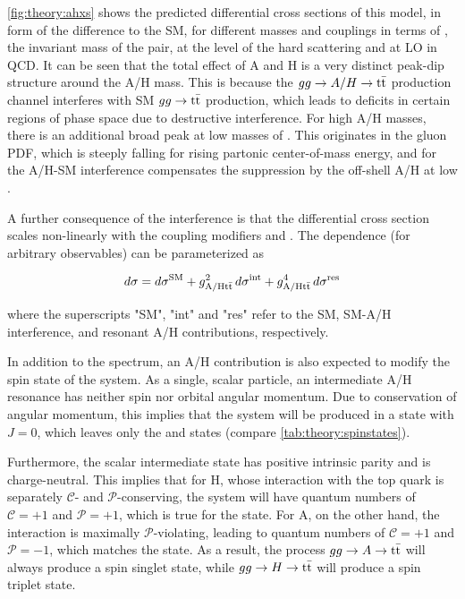 \cref{fig:theory:ahxs} shows the predicted differential cross sections of this model, in form of the difference to the SM, for different masses and couplings in terms of \mtt, the invariant mass of the \ttbar pair, at the level of the hard scattering and at LO in QCD. It can be seen that the total effect of A and H is a very distinct peak-dip structure around the A/H mass. This is because the $gg \rightarrow A/H \rightarrow \mathrm{t \bar{t}}$ production channel interferes with SM $gg \rightarrow \mathrm{t \bar{t}}$ production, which leads to deficits in certain regions of phase space due to destructive interference. For high A/H masses, there is an additional broad peak at low masses of \mtt. This originates in the gluon PDF, which is steeply falling for rising partonic center-of-mass energy, and for the A/H-SM interference compensates the suppression by the off-shell A/H at low \mtt.

A further consequence of the interference is that the differential cross section scales non-linearly with the coupling modifiers \gAtt and \gHtt. The dependence (for arbitrary observables) can be parameterized as 

\begin{equation}
    d \sigma = d \sigma^{\mathrm{SM}} + g_{\mathrm{A/H t \bar{t}}}^2 \, d \sigma^{\mathrm{int}} + g_{\mathrm{A/H t \bar{t}}}^4 \, d \sigma^{\mathrm{res}}
\end{equation}

\noindent where the superscripts "SM", "int" and "res" refer to the SM, SM-A/H interference, and resonant A/H contributions, respectively.

In addition to the \mtt spectrum, an A/H contribution is also expected to modify the spin state of the \ttbar system. As a single, scalar particle, an intermediate A/H resonance has neither spin nor orbital angular momentum. Due to conservation of angular momentum, this implies that the \ttbar system will be produced in a state with $J = 0$, which leaves only the  and  states (compare \cref{tab:theory:spinstates}).

Furthermore, the scalar intermediate state has positive intrinsic parity and is charge-neutral. This implies that for H, whose interaction with the top quark is separately $\mathcal{C}$- and $\mathcal{P}$-conserving, the \ttbar system will have quantum numbers of $\mathcal{C} = +1$ and $\mathcal{P} = +1$, which is true for the  state. For A, on the other hand, the interaction is maximally $\mathcal{P}$-violating, leading to quantum numbers of $\mathcal{C} = +1$ and $\mathcal{P} = -1$, which matches the  state. As a result, the process $gg \rightarrow A \rightarrow \mathrm{t \bar{t}}$ will always produce a spin singlet state, while $gg \rightarrow H \rightarrow \mathrm{t \bar{t}}$ will produce a spin triplet state.

